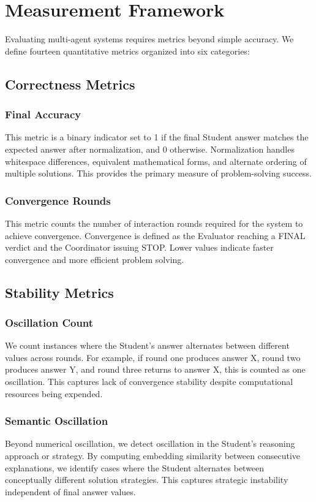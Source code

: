 \documentclass[conference]{IEEEtran}
\begin{document}
\section{Measurement Framework}

Evaluating multi-agent systems requires metrics beyond simple accuracy. We define fourteen quantitative metrics organized into six categories:

\subsection{Correctness Metrics}

\subsubsection{Final Accuracy}
This metric is a binary indicator set to 1 if the final Student answer matches the expected answer after normalization, and 0 otherwise. Normalization handles whitespace differences, equivalent mathematical forms, and alternate ordering of multiple solutions. This provides the primary measure of problem-solving success.

\subsubsection{Convergence Rounds}
This metric counts the number of interaction rounds required for the system to achieve convergence. Convergence is defined as the Evaluator reaching a FINAL verdict and the Coordinator issuing STOP. Lower values indicate faster convergence and more efficient problem solving.

\subsection{Stability Metrics}

\subsubsection{Oscillation Count}
We count instances where the Student's answer alternates between different values across rounds. For example, if round one produces answer X, round two produces answer Y, and round three returns to answer X, this is counted as one oscillation. This captures lack of convergence stability despite computational resources being expended.

\subsubsection{Semantic Oscillation}
Beyond numerical oscillation, we detect oscillation in the Student's reasoning approach or strategy. By computing embedding similarity between consecutive explanations, we identify cases where the Student alternates between conceptually different solution strategies. This captures strategic instability independent of final answer values.
\end{document}
